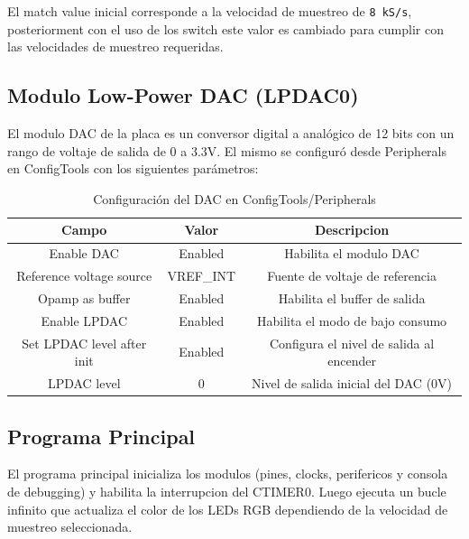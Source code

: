 \documentclass[11pt,a4paper]{article}
\begin{document}
El match value inicial corresponde a la velocidad de muestreo de \texttt{8
    kS/s}, posteriorment con el uso de los switch este valor es cambiado para
cumplir con las velocidades de muestreo requeridas.

\subsection{Modulo Low-Power DAC (LPDAC0)}

El modulo DAC de la placa es un conversor digital a analógico de 12 bits con un
rango de voltaje de salida de 0 a 3.3V. El mismo se configuró desde Peripherals
en ConfigTools con los siguientes parámetros:

\begin{table}[H]
    \centering
    \begin{tabular}{|c|c|c|}
        \hline
        \textbf{Campo}             & \textbf{Valor} & \textbf{Descripcion}                     \\
        \hline
        Enable DAC                 & Enabled        & Habilita el modulo DAC                   \\
        Reference voltage source   & VREF\_INT      & Fuente de voltaje de referencia          \\
        Opamp as buffer            & Enabled        & Habilita el buffer de salida             \\
        Enable LPDAC               & Enabled        & Habilita el modo de bajo consumo         \\
        Set LPDAC level after init & Enabled        & Configura el nivel de salida al encender \\
        LPDAC level                & 0              & Nivel de salida inicial del DAC (0V)     \\
        \hline
    \end{tabular}
    \caption{Configuración del DAC en ConfigTools/Peripherals}
\end{table}

\subsection{Programa Principal}

El programa principal inicializa los modulos (pines, clocks, perifericos y
consola de debugging) y habilita la interrupcion del CTIMER0. Luego ejecuta un
bucle infinito que actualiza el color de los LEDs RGB dependiendo de la
velocidad de muestreo seleccionada.
\end{document}
